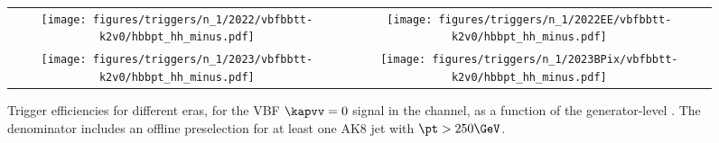 
    \begin{figure}[H]
        \centering
        \begin{tabular}{cc}
            \texttt{[image: figures/triggers/n\_1/2022/vbfbbtt-k2v0/hbbpt\_hh\_minus.pdf]} &
            \texttt{[image: figures/triggers/n\_1/2022EE/vbfbbtt-k2v0/hbbpt\_hh\_minus.pdf]} \\[1ex]
            \texttt{[image: figures/triggers/n\_1/2023/vbfbbtt-k2v0/hbbpt\_hh\_minus.pdf]} &
            \texttt{[image: figures/triggers/n\_1/2023BPix/vbfbbtt-k2v0/hbbpt\_hh\_minus.pdf]}
            \label{fig}
        \end{tabular}
\caption{Trigger efficiencies for different eras, for the VBF \HHbbtt $\kapvv=0$ signal in the \tauhh channel, as a function of the generator-level \hbb \pt. The denominator includes an offline preselection for at least one AK8 jet with $\pt > 250\GeV$.}
\label{fig:triggers_n-1_vbfbbtt-k2v0_hh_hbbpt}
\end{figure}
